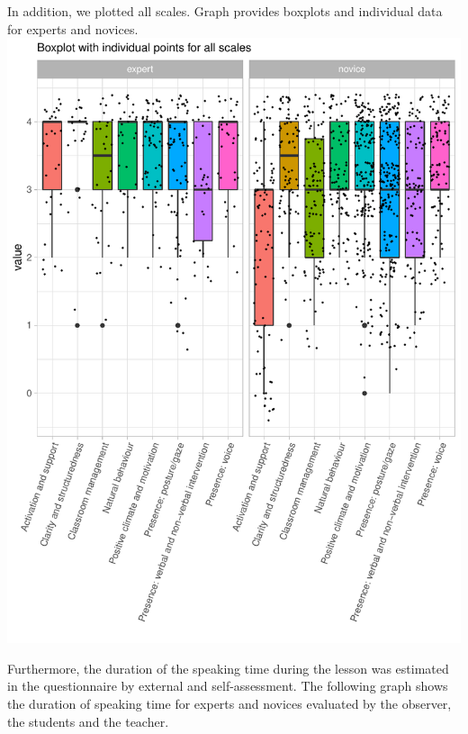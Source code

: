 \documentclass[
  english,
  man,floatsintext]{apa6}
\begin{document}
In addition, we plotted all scales. Graph provides boxplots and individual data for experts and novices.
\includegraphics{paper_1_supplement_files/figure-latex/boxplot scales-1.pdf}

Furthermore, the duration of the speaking time during the lesson was estimated in the questionnaire by external and self-assessment. The following graph shows the duration of speaking time for experts and novices evaluated by the observer, the students and the teacher.
\end{document}
